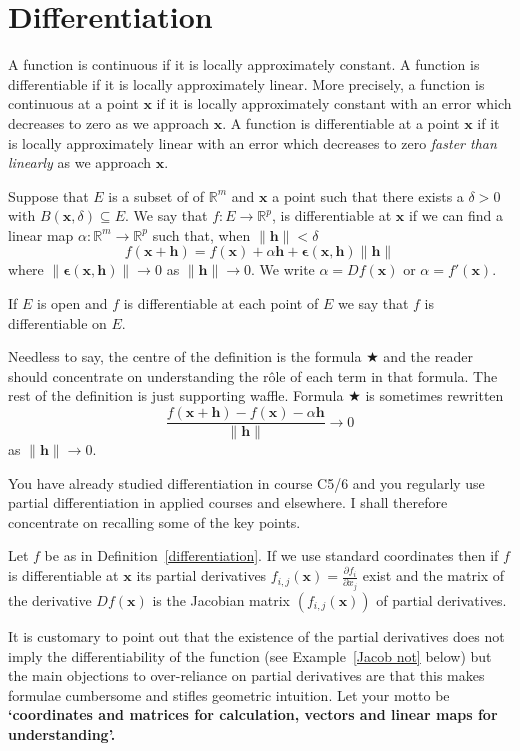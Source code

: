 \section{Differentiation}  A function is continuous if
it is locally approximately constant. A function is
differentiable if it is locally approximately linear.
More precisely, a function is continuous at a point ${\mathbf x}$
if it is locally approximately constant  with an error
which decreases to zero as we approach ${\mathbf x}$.
A function is
differentiable at a point ${\mathbf x}$
if it is locally approximately linear with an error
which decreases to zero \emph{faster than linearly}
as we approach  ${\mathbf x}$.
\begin{definition}\label{differentiation}
Suppose that $E$ is a subset of
of ${\mathbb R}^{m}$ and ${\mathbf x}$ a point such that
there exists a $\delta>0$ with 
$B({\mathbf x},\delta)\subseteq E$.
We say that $f:E\rightarrow  {\mathbb R}^{p}$,
is differentiable at ${\mathbf x}$ if we can find a linear
map $\alpha:{\mathbb R}^{m}\rightarrow{\mathbb R}^{p}$
such that, when $\|{\mathbf h}\|<\delta$
\begin{equation*}
f({\mathbf x}+{\mathbf h})=f({\mathbf x})+\alpha{\mathbf h}
+{\boldsymbol\epsilon}({\mathbf x},{\mathbf h})\|{\mathbf h}\|
\tag*{$\bigstar$}
\end{equation*}
where 
$\|{\boldsymbol\epsilon}({\mathbf x},{\mathbf h})\|\rightarrow 0$
as $\|{\mathbf h\|}\rightarrow 0$.
We write $\alpha=Df({\mathbf x})$
or $\alpha=f'({\mathbf x})$.

If $E$ is open and $f$ is differentiable at each point of
$E$ we say that $f$ is differentiable on $E$.
\end{definition}
Needless to say, the centre of the definition is
the formula $\bigstar$ and the reader should concentrate
on understanding the r\^{o}le of each term in that
formula. The rest of the definition is just supporting
waffle. Formula $\bigstar$ is sometimes rewritten
\[\frac{f({\mathbf x}+{\mathbf h})-f({\mathbf x})
-\alpha{\mathbf h}}{\|{\mathbf h}\|}\rightarrow 0\]
as $\|{\mathbf h}\|\rightarrow 0$.

You have already studied differentiation in
course C5/6 and you regularly use partial differentiation
in applied courses and elsewhere. I shall therefore
concentrate on recalling some of the key points.
\begin{lemma} Let $f$ be as in Definition~\ref{differentiation}.
If we use standard coordinates then
if $f$ is differentiable at ${\mathbf x}$ its
partial derivatives 
${\displaystyle  f_{i,j}({\mathbf x})=
\frac{\partial f_{i}}{\partial x_{j}}}$ exist and the
matrix of the derivative $Df({\mathbf x})$ is the 
Jacobian matrix $(f_{i,j}({\mathbf x}))$ of partial 
derivatives.
\end{lemma}
It is customary to point out that the existence
of the partial derivatives does not imply the
differentiability of the function (see Example~\ref{Jacob not}
below) but the main objections to over-reliance on
partial derivatives are that this makes formulae
cumbersome and stifles geometric intuition.
Let your motto be
{\bf `coordinates and matrices for calculation,
vectors and linear maps for understanding'.}

